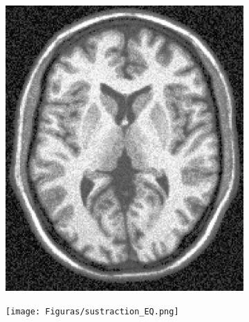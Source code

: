 \documentclass[11pt,twocolumn,twoside]{opticajnl}
\begin{document}
\begin{figure}[h]
    \centering
        \begin{subfigure}[h]{0.24\linewidth}
            \centering
            \includegraphics[width=\textwidth]{Figuras/ImageA_EQ}
        \end{subfigure}
        \begin{subfigure}[h]{0.24\linewidth}
            \centering
            \texttt{[image: Figuras/sustraction\_EQ.png]}
        \end{subfigure}
                \caption{Diferencia entre la imagen original y la imagen ecualizada.}
                \label{fig:EQ_sustraction}
         \begin{subfigure}[h]{0.24\linewidth}
            \centering

\end{subfigure}
\end{figure}
\end{document}
